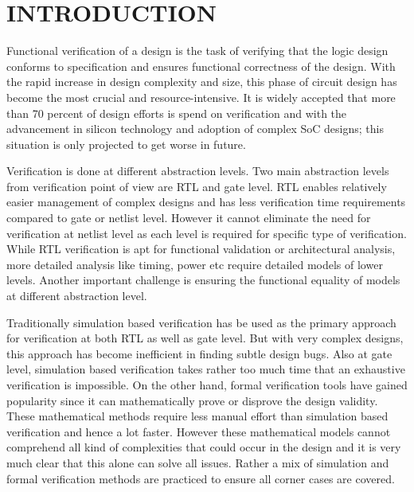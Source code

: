 \chapter{INTRODUCTION}

Functional verification of a design is the task of verifying that the logic design conforms to specification and ensures functional correctness of the design.  With the rapid increase in design complexity and size, this phase of circuit design has become the most crucial and resource-intensive. It is widely accepted that more than 70 percent of design efforts is spend on verification and with the advancement in silicon technology and adoption of complex SoC designs; this situation is only projected to get worse in future. 

Verification is done at different abstraction levels. Two main abstraction levels from verification point of view are RTL and gate level. RTL enables relatively easier management of complex designs and has less verification time requirements compared to gate or netlist level. However it cannot eliminate the need for verification at netlist level as each level is required for specific type of verification. While RTL verification is apt for functional validation or architectural analysis, more detailed analysis like timing, power etc require detailed models of lower levels. Another important challenge is ensuring the functional equality of models at different abstraction level.  

 Traditionally simulation based verification has be used as the primary approach for verification at both RTL as well as gate level.  But with very complex designs, this approach has become inefficient in finding subtle design bugs. Also at gate level, simulation based verification takes rather too much time that an exhaustive verification is impossible. On the other hand, formal verification tools have gained popularity since it can mathematically prove or disprove the design validity. These mathematical methods require less manual effort than simulation based verification and hence a lot faster. However these mathematical models cannot comprehend all kind of complexities that could occur in the design and it is very much clear that this alone can solve all issues. Rather a mix of simulation and formal verification methods are practiced to ensure all corner cases are covered. 



